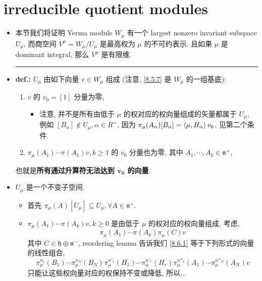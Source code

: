 \section{irreducible quotient modules}
\begin{itemize}
	\item 本节我们将证明 Verma module $W_\mu$ 有一个 largest nonzero invariant subspace $U_\mu$, 而商空间 $V^\mu = W_\mu / U_\mu$ 是最高权为 $\mu$ 的不可约表示. 且如果 $\mu$ 是 dominant integral, 那么 $V^\mu$ 是有限维.
	
	\noindent\rule[0.5ex]{\linewidth}{0.5pt} %
	
	\item \textbf{def.:} $U_\mu$ 由如下向量 $v \in W_\mu$ 组成 (注意, \eqref{8.5.7} 是 $W_\mu$ 的一组基底):
	\begin{enumerate}
		\item $v$ 的 $v_0 = [1]$ 分量为零,
		\begin{itemize}
			\item 注意, 并不是所有由低于 $\mu$ 的权对应的权向量组成的矢量都属于 $U_\mu$, 例如 $[B_\alpha] \notin U_\mu, \alpha \in R^+$, 因为 $\pi_\mu(A_\alpha) [B_\alpha] = \braket{\mu, H_\alpha} v_0$, 见第二个条件.
		\end{itemize}
		
		\item $\pi_\mu(A_1) \cdots \pi(A_k) v, k \geq 1$ 的 $v_0$ 分量也为零, 其中 $A_1, \cdots, A_k \in \mathfrak{n}^+$,
	\end{enumerate}
	也就是\textbf{所有通过升算符无法达到 $\boldsymbol{v_0}$ 的向量}.
	
	\item $U_\mu$ 是一个不变子空间.
	
	\begin{tcolorbox}[title=proof:]
		\begin{itemize}
			\item 首先 $\pi_\mu(A)[U_\mu] \subseteq U_\mu, \forall A \in \mathfrak{n}^+$.
			
			\item $\pi_\mu(A_1) \cdots \pi(A_k) v, k \geq 0$ 是由低于 $\mu$ 的权对应的权向量组成, 考虑,
			\begin{equation} \label{8.6.1}
				\pi_\mu(A_1) \cdots \pi(A_k) \pi_\mu(C) v
			\end{equation}
			其中 $C \in \mathfrak{h} \oplus \mathfrak{n}^-$, reordering lemma 告诉我们 \eqref{8.6.1} 等于下列形式的向量的线性组合, 
			\begin{equation}
				\pi_\mu^{n_1}(B_1) \cdots \pi_\mu^{n_N}(B_N) \pi_\mu^{n'_1}(H_1) \cdots \pi_\mu^{n'_r}(H_r) \pi_\mu^{n''_1}(A_1) \cdots \pi_\mu^{n''_N}(A_N) v
			\end{equation}
			只能让这些权向量对应的权保持不变或降低, 所以...
		\end{itemize}
	\end{tcolorbox}
	

\end{itemize}
